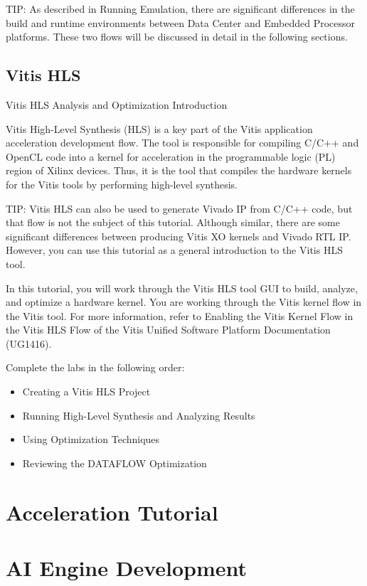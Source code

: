 TIP: As described in Running Emulation, there are significant differences in the build and runtime environments between Data Center and Embedded Processor platforms. These two flows will be discussed in detail in the following sections.

\subsection{Vitis HLS}

Vitis HLS Analysis and Optimization
Introduction

Vitis High-Level Synthesis (HLS) is a key part of the Vitis application acceleration development flow. The tool is responsible for compiling C/C++ and OpenCL code into a kernel for acceleration in the programmable logic (PL) region of Xilinx devices. Thus, it is the tool that compiles the hardware kernels for the Vitis tools by performing high-level synthesis.

TIP: Vitis HLS can also be used to generate Vivado IP from C/C++ code, but that flow is not the subject of this tutorial. Although similar, there are some significant differences between producing Vitis XO kernels and Vivado RTL IP. However, you can use this tutorial as a general introduction to the Vitis HLS tool.

In this tutorial, you will work through the Vitis HLS tool GUI to build, analyze, and optimize a hardware kernel. You are working through the Vitis kernel flow in the Vitis tool. For more information, refer to Enabling the Vitis Kernel Flow in the Vitis HLS Flow of the Vitis Unified Software Platform Documentation (UG1416).

Complete the labs in the following order:

\begin{itemize}
    \item Creating a Vitis HLS Project
    \item Running High-Level Synthesis and Analyzing Results
    \item Using Optimization Techniques
    \item Reviewing the DATAFLOW Optimization
\end{itemize}


\section{Acceleration Tutorial}
\section{AI Engine Development}
